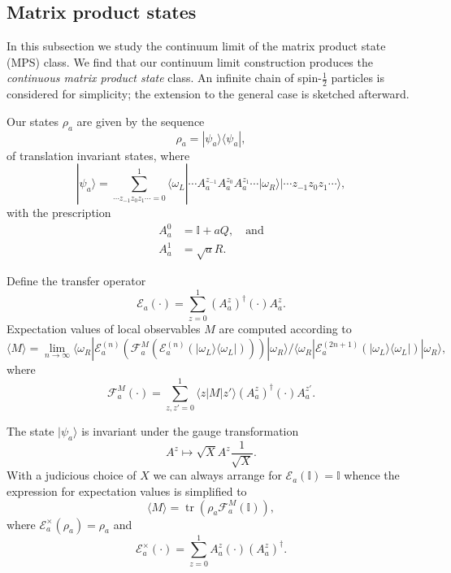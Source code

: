 \documentclass[prl,twocolumn,lengthcheck,superscriptaddress]{revtex4-1}
\newcommand{\tr}{\operatorname{tr}}
\theoremstyle{definition}
\theoremstyle{remark}
\begin{document}
\subsection{Matrix product states}
In this subsection we study the continuum limit of the matrix product state (MPS) class. We find that our continuum limit construction produces the \emph{continuous matrix product state} class. An infinite chain of spin-$\frac12$ particles is considered for simplicity; the extension to the general case is sketched afterward. 

Our states $\rho_a$ are given by the sequence
\begin{equation}
	\rho_a = |\psi_a\rangle\langle \psi_a|,
\end{equation}
of translation invariant states, where
\begin{equation}
	|\psi_a\rangle = \sum_{\cdots z_{-1}z_0z_{1} \cdots = 0}^{1}\langle \omega_L| \cdots A^{z_{-1}}_aA^{z_{0}}_a A^{z_{1}}_a\cdots |\omega_R\rangle |\cdots z_{-1}z_0z_{1} \cdots \rangle,
\end{equation}
with the prescription
\begin{equation}
	\begin{split}
		A^0_a &= \mathbb{I} + a Q, \quad \text{and} \\
		A^1_a &= \sqrt{a} R.
	\end{split}
\end{equation}

Define the transfer operator
\begin{equation}
	\mathcal{E}_a(\cdot) = \sum_{z=0}^1 (A^z_a)^\dag (\cdot) A^z_a.
\end{equation}
Expectation values of local observables $M$ are computed according to
\begin{equation}
	\langle M \rangle = \lim_{n\rightarrow \infty}\langle \omega_R| \mathcal{E}^{(n)}_a(\mathcal{F}_a^{M}(\mathcal{E}^{(n)}_a(|\omega_L\rangle \langle \omega_L|)))|\omega_R\rangle / \langle \omega_R| \mathcal{E}^{(2n+1)}_a(|\omega_L\rangle \langle \omega_L|)|\omega_R\rangle,
\end{equation}
where
\begin{equation}
	\mathcal{F}_a^{M}(\cdot) = \sum_{z,z'=0}^1 \langle z|M|z'\rangle  (A^z_a)^\dag (\cdot) A^{z'}_a.
\end{equation}

The state $|\psi_a\rangle$ is invariant under the gauge transformation 
\begin{equation}
A^z \mapsto \sqrt{X} A^{z} \frac{1}{\sqrt{X}}.
\end{equation}
With a judicious choice of $X$ we can always arrange for $\mathcal{E}_a(\mathbb{I}) = \mathbb{I}$ whence the expression for expectation values is simplified to
\begin{equation}
	\langle M \rangle = \tr(\rho_a \mathcal{F}_a^{M}(\mathbb{I})),
\end{equation}
where $\mathcal{E}_a^{\times} (\rho_a) = \rho_a$ and 
\begin{equation}
	\mathcal{E}_a^\times(\cdot) = \sum_{z=0}^1 A^z_a (\cdot) (A^z_a)^\dag.
\end{equation}
\end{document}
